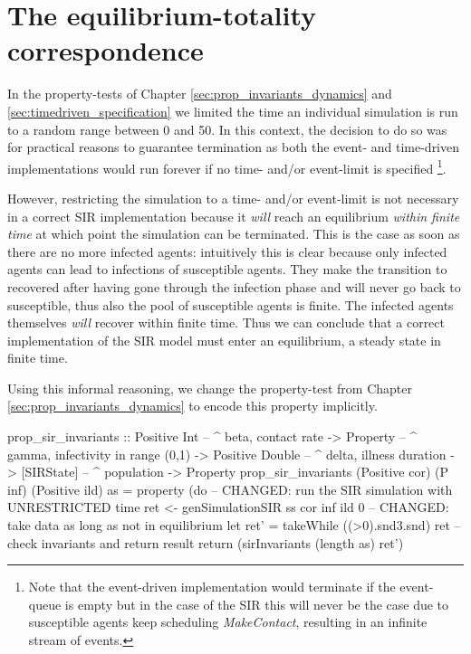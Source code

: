 \chapter{The equilibrium-totality correspondence}
\label{app:equilibrium_totality}

In the property-tests of Chapter \ref{sec:prop_invariants_dynamics} and \ref{sec:timedriven_specification} we limited the time an individual simulation is run to a random range between 0 and 50. In this context, the decision to do so was for practical reasons to guarantee termination as both the event- and time-driven implementations would run forever if no time- and/or event-limit is specified \footnote{Note that the event-driven implementation would terminate if the event-queue is empty but in the case of the SIR this will never be the case due to susceptible agents keep scheduling \textit{MakeContact}, resulting in an infinite stream of events.}.

However, restricting the simulation to a time- and/or event-limit is not necessary in a correct SIR implementation because it  \textit{will} reach an equilibrium \textit{within finite time} at which point the simulation can be terminated. This is the case as soon as there are no more infected agents: intuitively this is clear because only infected agents can lead to infections of susceptible agents. They make the transition to recovered after having gone through the infection phase and will never go back to susceptible, thus also the pool of susceptible agents is finite. The infected agents themselves \textit{will} recover within finite time. Thus we can conclude that a correct implementation of the SIR model must enter an equilibrium, a steady state in finite time.

Using this informal reasoning, we change the property-test from Chapter \ref{sec:prop_invariants_dynamics} to encode this property implicitly.

\begin{HaskellCode}
prop_sir_invariants :: Positive Int    -- ^ beta, contact rate
                    -> Property        -- ^ gamma, infectivity in range (0,1)
                    -> Positive Double -- ^ delta, illness duration
                    -> [SIRState]      -- ^ population
                    -> Property
prop_sir_invariants 
    (Positive cor) (P inf) (Positive ild) as  = property (do
  -- CHANGED: run the SIR simulation with UNRESTRICTED time
  ret <- genSimulationSIR ss cor inf ild 0
  -- CHANGED: take data as long as not in equilibrium
  let ret' = takeWhile ((>0).snd3.snd) ret
  -- check invariants and return result
  return (sirInvariants (length as) ret')
\end{HaskellCode}

